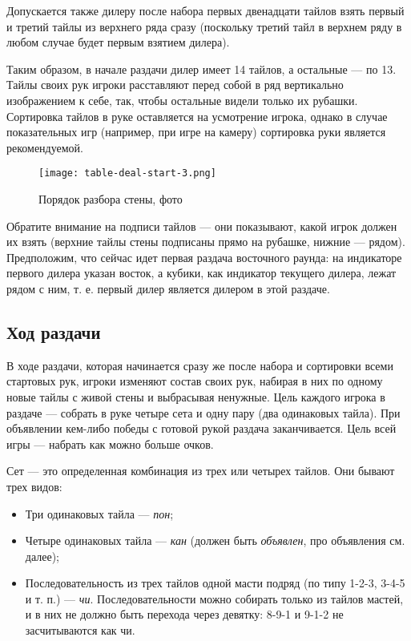 Допускается также дилеру после набора первых двенадцати тайлов взять первый и третий тайлы из верхнего ряда сразу (поскольку третий тайл в верхнем ряду в любом случае будет первым взятием дилера). 

Таким образом, в начале раздачи дилер имеет 14 тайлов, а остальные --- по 13. Тайлы своих рук игроки расставляют перед собой в ряд вертикально изображением к себе, так, чтобы остальные видели только их рубашки. Сортировка тайлов в руке оставляется на усмотрение игрока, однако в случае показательных игр (например, при игре на камеру) сортировка руки является рекомендуемой.

\begin{figure}[H]
	\centering
	\texttt{[image: table-deal-start-3.png]}
	\caption{Порядок разбора стены, фото}
\end{figure}

Обратите внимание на подписи тайлов --- они показывают, какой игрок должен их взять (верхние тайлы стены подписаны прямо на рубашке, нижние --- рядом). Предположим, что сейчас идет первая раздача восточного раунда: на индикаторе первого дилера указан восток, а кубики, как индикатор текущего дилера, лежат рядом с ним, т. е. первый дилер является дилером в этой раздаче.

\subsection{Ход раздачи}

В ходе раздачи, которая начинается сразу же после набора и сортировки всеми стартовых рук, игроки изменяют состав своих рук, набирая в них по одному новые тайлы с живой стены и выбрасывая ненужные. Цель каждого игрока в раздаче --- собрать в руке четыре сета и одну пару (два одинаковых тайла). При объявлении кем-либо победы с готовой рукой раздача заканчивается. Цель всей игры --- набрать как можно больше очков.

Сет --- это определенная комбинация из трех или четырех тайлов. Они бывают трех видов:
\begin{itemize}
	\item Три одинаковых тайла --- \textit{пон};
	\item Четыре одинаковых тайла --- \textit{кан} (должен быть \textit{объявлен}, про объявления см. далее);
	\item Последовательность из трех тайлов одной масти подряд (по типу 1-2-3, 3-4-5 и т. п.) --- \textit{чи}. Последовательности можно собирать только из тайлов мастей, и в них не должно быть перехода через девятку: 8-9-1 и 9-1-2 не засчитываются как чи.
\end{itemize}

